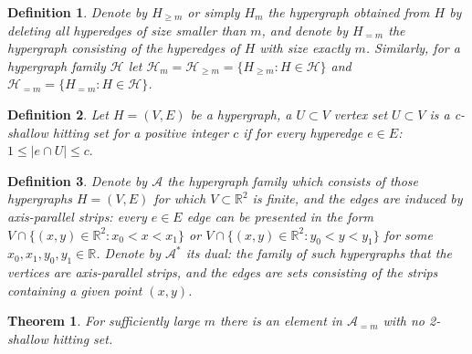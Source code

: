\documentclass[10pt,a4paper]{amsart}
\newcommand{\R}{\mathbb{R}}
\newcommand{\HH}{\mathcal{H}}
\newcommand{\A}{\mathcal{A}}
\newtheorem{theorem}{Theorem}
\newtheorem{definition}{Definition}
\begin{document}
\begin{definition} Denote by $H_{\ge m}$ or simply $H_m$ the hypergraph obtained from $H$ by deleting all hyperedges of size smaller than $m$, and denote by $H_{=m}$ the hypergraph consisting of the hyperedges of $H$ with size exactly $m$. Similarly, for a hypergraph family $\mathcal{H}$ let $\HH_m=\HH_{\ge m}=\{H_{\ge m}:H\in\HH\}$ and $\HH_{=m}=\{H_{=m}:H\in\HH\}$.
\end{definition}

\begin{definition}
 Let $H=(V,E)$ be a hypergraph, a $U\subset V$ vertex set $U\subset V$ is a {\it c-shallow hitting set} for a positive integer $c$ if for every hyperedge $e\in E$: $1\le|e\cap U|\le c.$
\end{definition} 

\begin{definition} Denote by $\A$ the hypergraph family which consists of those hypergraphs $H=(V,E)$ for which $V\subset \R^2$ is finite, and the edges are induced by axis-parallel strips: every $e\in E$ edge can be presented in the form $V\cap\{(x,y)\in\R^2: x_0<x<x_1\}$ or $V\cap\{(x,y)\in\R^2: y_0<y<y_1\}$ for some $x_0, x_1, y_0, y_1 \in\R$. Denote by $\A^*$ its dual: the family of such hypergraphs that the vertices are axis-parallel strips, and the edges are sets consisting of the strips containing a given point $(x,y)$. 
\end{definition}

\begin{theorem}\label{strip}
For sufficiently large $m$ there is an element in $\A_{=m}$ with no 2-shallow hitting set.
\end{theorem}
\end{document}
